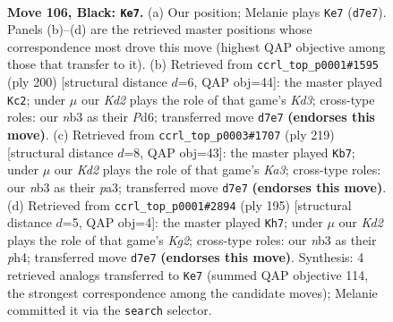 \documentclass[11pt]{article}
\begin{document}
\clearpage

\begin{figure}[p]\centering
\begin{subfigure}{0.46\textwidth}\centering
\resizebox{\linewidth}{!}{%
\newchessgame
\chessboard[
  setfen={8/3k4/8/8/5K2/1N6/2R3Pr/8 b - - 77 106},
  showmover=false,
  pgfstyle=straightmove, color=movearrow, markmove={d7-e7}
]}
\caption{}
\end{subfigure}\hfill
\begin{subfigure}{0.46\textwidth}\centering
\resizebox{\linewidth}{!}{%
\newchessgame
\chessboard[
  setfen={8/8/r2P4/8/5k2/3K4/p7/R7 w - - 7 101},
  showmover=false,
  pgfstyle=straightmove, color=movearrow, markmove={d3-c2}
]}
\caption{}
\end{subfigure}
\\[4pt]
\begin{subfigure}{0.46\textwidth}\centering
\resizebox{\linewidth}{!}{%
\newchessgame
\chessboard[
  setfen={7R/8/k7/8/7P/P6r/1K6/8 b - - 4 110},
  showmover=false,
  pgfstyle=straightmove, color=movearrow, markmove={a6-b7}
]}
\caption{}
\end{subfigure}\hfill
\begin{subfigure}{0.46\textwidth}\centering
\resizebox{\linewidth}{!}{%
\newchessgame
\chessboard[
  setfen={1R6/1P4k1/8/2K5/7P/8/1r6/8 b - - 8 98},
  showmover=false,
  pgfstyle=straightmove, color=movearrow, markmove={g7-h7}
]}
\caption{}
\end{subfigure}
\caption{\textbf{Move 106, Black: \texttt{Ke7}.} (a) Our position; Melanie plays \texttt{Ke7} (\texttt{d7e7}). Panels (b)--(d) are the retrieved master positions whose correspondence most drove this move (highest QAP objective among those that transfer to it). (b) Retrieved from \texttt{ccrl\_top\_p0001\#1595} (ply 200) [structural distance $d$=6, QAP obj=44]: the master played \texttt{Kc2}; under $\mu$ our \emph{Kd2} plays the role of that game's \emph{Kd3}; cross-type roles: our \emph{n}b3 as their \emph{P}d6; transferred move \texttt{d7e7} \textbf{(endorses this move)}. (c) Retrieved from \texttt{ccrl\_top\_p0003\#1707} (ply 219) [structural distance $d$=8, QAP obj=43]: the master played \texttt{Kb7}; under $\mu$ our \emph{Kd2} plays the role of that game's \emph{Ka3}; cross-type roles: our \emph{n}b3 as their \emph{p}a3; transferred move \texttt{d7e7} \textbf{(endorses this move)}. (d) Retrieved from \texttt{ccrl\_top\_p0001\#2894} (ply 195) [structural distance $d$=5, QAP obj=4]: the master played \texttt{Kh7}; under $\mu$ our \emph{Kd2} plays the role of that game's \emph{Kg2}; cross-type roles: our \emph{n}b3 as their \emph{p}h4; transferred move \texttt{d7e7} \textbf{(endorses this move)}. Synthesis: 4 retrieved analogs transferred to \texttt{Ke7} (summed QAP objective 114, the strongest correspondence among the candidate moves); Melanie committed it via the \texttt{search} selector.}
\label{fig:thought-m211}
\end{figure}
\end{document}
